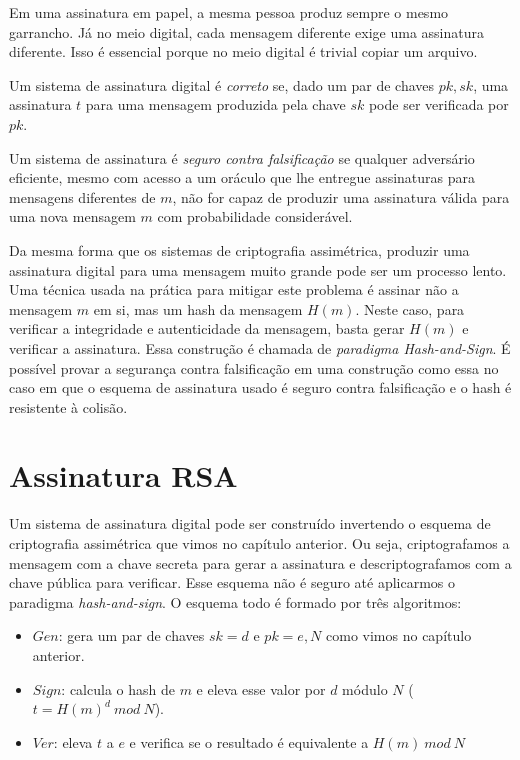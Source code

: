 Em uma assinatura em papel, a mesma pessoa produz sempre o mesmo garrancho.
Já no meio digital, cada mensagem diferente exige uma assinatura diferente.
Isso é essencial porque no meio digital é trivial copiar um arquivo.

Um sistema de assinatura digital é {\em correto} se, dado um par de chaves $pk, sk$, uma assinatura $t$ para uma mensagem produzida pela chave $sk$ pode ser verificada por $pk$.

Um sistema de assinatura é {\em seguro contra falsificação} se qualquer adversário eficiente, mesmo com acesso a um oráculo que lhe entregue assinaturas para mensagens diferentes de $m$, não for capaz de produzir uma assinatura válida para uma nova mensagem $m$ com probabilidade considerável.

Da mesma forma que os sistemas de criptografia assimétrica, produzir uma assinatura digital para uma mensagem muito grande pode ser um processo lento.
Uma técnica usada na prática para mitigar este problema é assinar não a mensagem $m$ em si, mas um hash da mensagem $H(m)$.
Neste caso, para verificar a integridade e autenticidade da mensagem, basta gerar $H(m)$ e verificar a assinatura.
Essa construção é chamada de {\em paradigma Hash-and-Sign}.
É possível provar a segurança contra falsificação em uma construção como essa no caso em que o esquema de assinatura usado é seguro contra falsificação e o hash é resistente à colisão.

\section{Assinatura RSA}
\label{sec:assinatura-rsa}
Um sistema de assinatura digital pode ser construído invertendo o esquema de criptografia assimétrica que vimos no capítulo anterior.
Ou seja, criptografamos a mensagem com a chave secreta para gerar a assinatura e descriptografamos com a chave pública para verificar.
Esse esquema não é seguro até aplicarmos o paradigma {\em hash-and-sign}.
O esquema todo é formado por três algoritmos:

\begin{itemize}
\item $Gen$: gera um par de chaves $sk = d$ e $pk = e, N$ como vimos no capítulo anterior.
\item $Sign$: calcula o hash de $m$ e eleva esse valor por $d$ módulo $N$ ($t = H(m)^d\ mod\ N$).
\item $Ver$: eleva $t$ a $e$ e verifica se o resultado é equivalente a $H(m)\ mod\ N$ 
\end{itemize}

